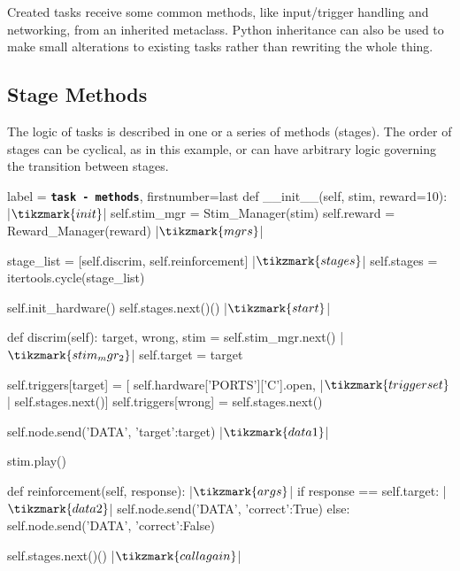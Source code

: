 Created tasks receive some common methods, like input/trigger handling and networking, from an inherited metaclass. Python inheritance can also be used to make small alterations to existing tasks rather than rewriting the whole thing.

\subsection{Stage Methods}

The logic of tasks is described in one or a series of methods (stages). The order of stages can be cyclical, as in this example, or can have arbitrary logic governing the transition between stages.
\vspace{10pt}

\begin{pythoncode*}{label = \texttt{\textbf{task - methods}}, firstnumber=last}
    def __init__(self, stim, reward=10): |$\tikzmark{init}$|
        self.stim_mgr = Stim_Manager(stim)
        self.reward   = Reward_Manager(reward) |$\tikzmark{mgrs}$|

        stage_list  = [self.discrim, self.reinforcement] |$\tikzmark{stages}$|
        self.stages = itertools.cycle(stage_list)

        self.init_hardware()
        self.stages.next()() |$\tikzmark{start}$|

    def discrim(self):
        target, wrong, stim = self.stim_mgr.next() |$\tikzmark{stim_mgr_2}$|
        self.target = target

        self.triggers[target] = [
            self.hardware['PORTS']['C'].open, |$\tikzmark{triggerset}$|
            self.stages.next()]
        self.triggers[wrong] = self.stages.next()

        self.node.send('DATA', {'target':target}) |$\tikzmark{data1}$|

        stim.play()

    def reinforcement(self, response): |$\tikzmark{args}$|
        if response == self.target: |$\tikzmark{data2}$|
            self.node.send('DATA', {'correct':True})
        else:
            self.node.send('DATA', {'correct':False})

        self.stages.next()() |$\tikzmark{callagain}$|
\end{pythoncode*}

